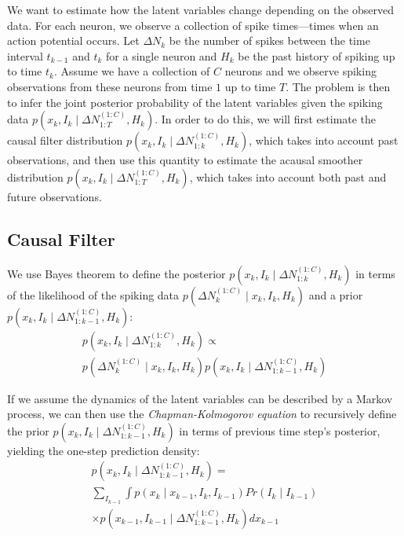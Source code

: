 \documentclass[conference]{IEEEtran}
\begin{document}
We want to estimate how the latent variables change depending on the observed data. For each neuron, we observe a collection of spike times---times when an action potential occurs. Let $\Delta N_{k}$ be the number of spikes between the time interval $t_{k-1}$ and $t_{k}$ for a single neuron and $H_{k}$ be the past history of spiking up to time $t_{k}$. Assume we have a collection of $C$ neurons and we observe spiking observations from these neurons from time $1$ up to time $T$. The problem is then to infer the joint posterior probability of the latent variables given the spiking data $p(x_{k}, I_{k} \mid \Delta N_{1:T}^{(1:C)}, H_{k})$. In order to do this, we will first estimate the causal filter distribution $p(x_{k}, I_{k} \mid \Delta N_{1:k}^{(1:C)}, H_{k})$, which takes into account past observations, and then use this quantity to estimate the acausal smoother distribution $p(x_{k}, I_{k} \mid \Delta N_{1:T}^{(1:C)}, H_{k})$, which takes into account both past and future observations.

\subsection{Causal Filter}
We use Bayes theorem to define the posterior $p(x_{k}, I_{k} \mid \Delta N_{1:k}^{(1:C)}, H_{k})$ in terms of the likelihood of the spiking data $p(\Delta N_{k}^{(1:C)} \mid x_{k}, I_{k}, H_{k})$ and a prior $p(x_{k}, I_{k} \mid \Delta N_{1:k-1}^{(1:C)}, H_{k})$:
\begin{multline}
p(x_{k}, I_{k} \mid \Delta N_{1:k}^{(1:C)}, H_{k}) \propto \\
p(\Delta N_{k}^{(1:C)}  \mid x_{k}, I_{k}, H_{k}) p(x_{k}, I_{k} \mid \Delta N_{1:k-1}^{(1:C)}, H_{k}) 
\end{multline}

If we assume the dynamics of the latent variables can be described by a Markov process, we can then use the \textit{Chapman-Kolmogorov equation} to recursively define the prior $p(x_{k}, I_{k} \mid \Delta N_{1:k-1}^{(1:C)}, H_{k})$ in terms of previous time step's posterior, yielding the one-step prediction density:
\begin{multline}
p(x_{k}, I_{k} \mid \Delta N_{1:k-1}^{(1:C)}, H_{k}) = \\
\sum_{I_{k-1}} \int p(x_{k} \mid x_{k-1}, I_{k}, I_{k-1}) Pr(I_{k} \mid I_{k-1}) \\
\times p(x_{k-1}, I_{k-1} \mid \Delta N_{1:k-1}^{(1:C)}, H_{k}) dx_{k-1}
\end{multline}
\end{document}
